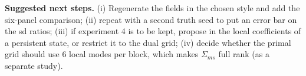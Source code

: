 \documentclass[11pt]{article}
\begin{document}
\textbf{Suggested next steps.} (i) Regenerate the fields in the chosen style and add the six-panel comparison; (ii) repeat with a second truth seed to put an error bar on the sd ratios; (iii) if experiment 4 is to be kept, propose in the local coefficients of a persistent state, or restrict it to the dual grid; (iv) decide whether the primal grid should use 6 local modes per block, which makes $\Sigma_{ms}$ full rank (as a separate study).
\end{document}
